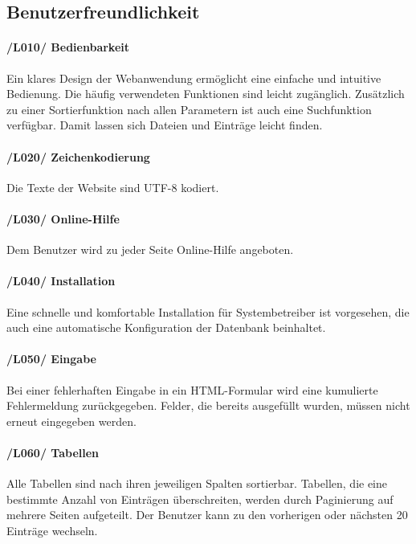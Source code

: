 \documentclass{article}
\begin{document}
\subsection{Benutzerfreundlichkeit}

     \paragraph{/L010/ \label{L010} Bedienbarkeit}
    Ein klares Design der Webanwendung ermöglicht eine einfache und intuitive Bedienung. Die häufig verwendeten Funktionen sind leicht zugänglich. Zusätzlich zu einer Sortierfunktion nach allen Parametern ist auch eine Suchfunktion verfügbar. Damit lassen sich Dateien und Einträge leicht finden.
    
     \paragraph{/L020/ \label{L020} Zeichenkodierung} Die Texte  der Website sind UTF-8 kodiert.
     
      \paragraph{/L030/  \label{L030} Online-Hilfe} Dem Benutzer wird zu jeder Seite Online-Hilfe angeboten.
      
      \paragraph{/L040/ \label{040} Installation}
      Eine schnelle und komfortable Installation für Systembetreiber ist vorgesehen, die auch eine automatische Konfiguration der Datenbank beinhaltet.
      
      \paragraph{/L050/ \label{L050} Eingabe}
      Bei einer fehlerhaften Eingabe in ein HTML-Formular wird eine kumulierte Fehlermeldung zurückgegeben. Felder, die bereits ausgefüllt wurden, müssen nicht erneut eingegeben werden.
      
      \paragraph{/L060/ \label{L060} Tabellen}
      
    Alle Tabellen sind nach ihren jeweiligen Spalten sortierbar. Tabellen,
    die eine bestimmte Anzahl von Einträgen überschreiten, werden durch Paginierung auf mehrere Seiten aufgeteilt. Der Benutzer kann zu den vorherigen oder nächsten 20 Einträge wechseln.
      
\end{document}
